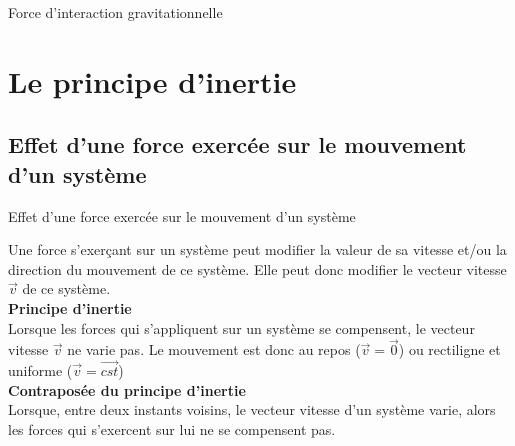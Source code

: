 \documentclass{beamer}
\begin{document}
    \begin{frame}{Force d'interaction gravitationnelle}
    \begin{minipage}{\linewidth}
    \centering
    \end{minipage}
    \end{frame}
    
\section{Le principe d'inertie}

    \subsection{Effet d'une force exercée sur le mouvement d'un système}
\begin{frame}{Effet d'une force exercée sur le mouvement d'un système}
    
            Une force s'exerçant sur un système peut modifier la valeur de sa vitesse et/ou la direction du mouvement de ce système. Elle peut donc modifier le vecteur vitesse $\vec{v}$ de ce système.\\
            \textbf{Principe d'inertie}\\
            Lorsque les forces qui s’appliquent sur un système se compensent, le vecteur vitesse $\vec{v}$ ne varie pas. Le mouvement est donc au repos ($\vec{v}=\vec{0}$) ou rectiligne et uniforme ($\vec{v}=\vec{cst}$)\\
            
            \textbf{Contraposée du principe d'inertie}\\
            Lorsque, entre deux instants voisins, le vecteur vitesse d’un système varie, alors les forces qui s’exercent sur lui ne se compensent pas.
\end{frame}
\end{document}

